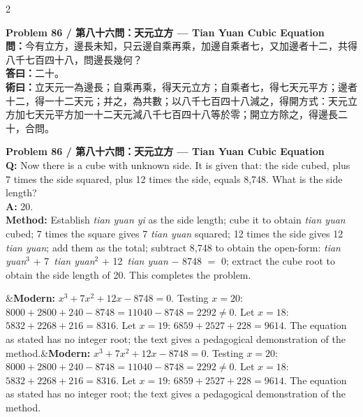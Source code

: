 \documentclass[11pt,a4paper]{article}
\newcommand{\bilingualproblem}[4]{%
  \begin{paracol}{2}
  \begin{leftcolumn}
  \noindent\textbf{\color{problemcolor}#1}\\[0.2cm]
  #2
  \end{leftcolumn}
  \switchcolumn
  \noindent\textbf{\color{problemcolor}#1}\\[0.2cm]
  #3
  \end{paracol}
  \ifx&#4&\else\vspace{0.3cm}\noindent#4\fi
  \vspace{0.5cm}
}
\newcommand{\wen}[1]{\textcolor{problemcolor}{\textbf{問：}}#1}
\newcommand{\da}[1]{\textcolor{answercolor}{\textbf{答曰：}}#1}
\newcommand{\shu}[1]{\textcolor{methodcolor}{\textbf{術曰：}}#1}
\newcommand{\wenen}[1]{\textcolor{problemcolor}{\textbf{Q:}} #1}
\newcommand{\daen}[1]{\textcolor{answercolor}{\textbf{A:}} #1}
\newcommand{\shuen}[1]{\textcolor{methodcolor}{\textbf{Method:}} #1}
\begin{document}
\bilingualproblem{Problem 86 / 第八十六問：天元立方 --- Tian Yuan Cubic Equation}{
\wen{今有立方，邊長未知，只云邊自乘再乘，加邊自乘者七，又加邊者十二，共得八千七百四十八，問邊長幾何？}\\[0.2cm]
\da{二十。}\\[0.2cm]
\shu{立天元一為邊長；自乘再乘，得天元立方；自乘者七，得七天元平方；邊者十二，得一十二天元；并之，為共數；以八千七百四十八減之，得開方式：天元立方加七天元平方加一十二天元減八千七百四十八等於零；開立方除之，得邊長二十，合問。}
}{
\wenen{Now there is a cube with unknown side. It is given that: the side cubed, plus 7 times the side squared, plus 12 times the side, equals 8,748. What is the side length?}\\[0.2cm]
\daen{20.}\\[0.2cm]
\shuen{Establish \textit{tian yuan yi} as the side length; cube it to obtain \textit{tian yuan} cubed; 7 times the square gives 7 \textit{tian yuan} squared; 12 times the side gives 12 \textit{tian yuan}; add them as the total; subtract 8,748 to obtain the open-form: \textit{tian yuan}$^3$ + 7\ \textit{tian yuan}$^2$ + 12\ \textit{tian yuan} $-$ 8748 $=$ 0; extract the cube root to obtain the side length of 20. This completes the problem.}
}{\textbf{Modern:} $x^3 + 7x^2 + 12x - 8748 = 0$. Testing $x = 20$: $8000 + 2800 + 240 - 8748 = 11040 - 8748 = 2292 \neq 0$. Let $x = 18$: $5832 + 2268 + 216 = 8316$. Let $x = 19$: $6859 + 2527 + 228 = 9614$. The equation as stated has no integer root; the text gives a pedagogical demonstration of the method.}
\end{document}

